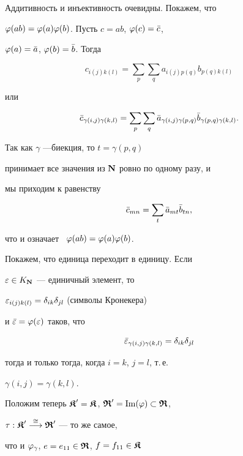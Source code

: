 \begin{pf} Аддитивность и инъективность очевидны. Покажем, что


$\varphi(ab)=\varphi(a)\varphi(b)$. Пусть $c=ab$, $\varphi(c)=\Bar c$,


$\varphi(a)=\Bar a$, $\varphi(b)=\bar b$. Тогда


$$


c_{i(j)k(l)}=\sum_p \sum_q a_{i(j)p(q)} b_{p(q)k(l)}


$$


или


$$


{\Bar c}_{\gamma(i,j)\gamma(k,l)}=


\sum_p \sum_q {\Bar a}_{\gamma(i,j)\gamma(p,q)}


{\Bar b}_{\gamma(p,q)\gamma(k,l)}.


$$


Так как $\gamma$ ---биекция, то $ t=\gamma(p,q)$


принимает все значения из $\bold N$ ровно по одному разу, и


мы приходим к равенству


$$


{\Bar c}_{mn}=\sum_t {\Bar a}_{mt} {\Bar b}_{tn},


$$


что и означает \ $\varphi(ab)=\varphi(a)\varphi(b)$.





Покажем, что единица переходит в единицу. Если


$\varepsilon \in K_{\bold N}$ --- единичный элемент, то


$\varepsilon_{i(j)k(l)}=\delta_{ik}\delta_{jl}$ (символы Кронекера)


и ${\Bar {\varepsilon}}=\varphi(\varepsilon)$ таков, что


$$


{\Bar \e}_{\gamma(i,j)\gamma(k,l)}=\delta_{ik}\delta_{jl}


$$


тогда и только тогда, когда $i=k$, $j=l$, т.\,е.


$\gamma(i,j)=\gamma(k,l)$.


\end{pf}





Положим теперь $\boldsymbol{\frak K}'=\boldsymbol{\frak K} $, $\boldsymbol{\frak R}'=\operatorname{Im}(\varphi) \subset \boldsymbol{\frak R}$,


$\tau: \boldsymbol{\frak K}'\overset{\cong}{\longrightarrow}\boldsymbol{\frak R}'$ --- то же самое,


что и $\varphi_{\gamma}$, $e=e_{11} \in \boldsymbol{\frak R}$, $f=f_{11} \in \boldsymbol{\frak K}$


